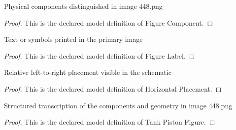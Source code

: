 \begin{definition}
  \label{def:physics:phyx-mini-0448:phyxminiproblems-problemphyxmini0448-figurecomponent}
  Physical components distinguished in image 448.png
\end{definition}
\begin{proof}
  This is the declared model definition of Figure Component.
\end{proof}
\begin{definition}
  \label{def:physics:phyx-mini-0448:phyxminiproblems-problemphyxmini0448-figurelabel}
  Text or symbols printed in the primary image
\end{definition}
\begin{proof}
  This is the declared model definition of Figure Label.
\end{proof}
\begin{definition}
  \label{def:physics:phyx-mini-0448:phyxminiproblems-problemphyxmini0448-horizontalplacement}
  Relative left-to-right placement visible in the schematic
\end{definition}
\begin{proof}
  This is the declared model definition of Horizontal Placement.
\end{proof}
\begin{definition}
  \label{def:physics:phyx-mini-0448:phyxminiproblems-problemphyxmini0448-tankpistonfigure}
  Structured transcription of the components and geometry in image 448.png
\end{definition}
\begin{proof}
  This is the declared model definition of Tank Piston Figure.
\end{proof}
